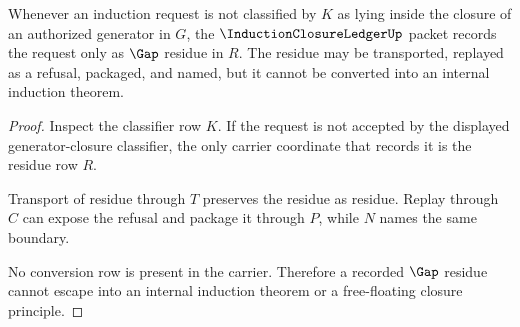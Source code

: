 \begin{theorem}
\label{thm:induction-closure-ledger-gap-nonescape}
Whenever an induction request is not classified by $K$ as lying inside the closure of an authorized generator in $G$, the $\InductionClosureLedgerUp$ packet records the request only as $\Gap$ residue in $R$. The residue may be transported, replayed as a refusal, packaged, and named, but it cannot be converted into an internal induction theorem.
\end{theorem}
\begin{proof}
Inspect the classifier row $K$. If the request is not accepted by the displayed generator-closure classifier, the only carrier coordinate that records it is the residue row $R$.

Transport of residue through $T$ preserves the residue as residue. Replay through $C$ can expose the refusal and package it through $P$, while $N$ names the same boundary.

No conversion row is present in the carrier. Therefore a recorded $\Gap$ residue cannot escape into an internal induction theorem or a free-floating closure principle.
\end{proof}

